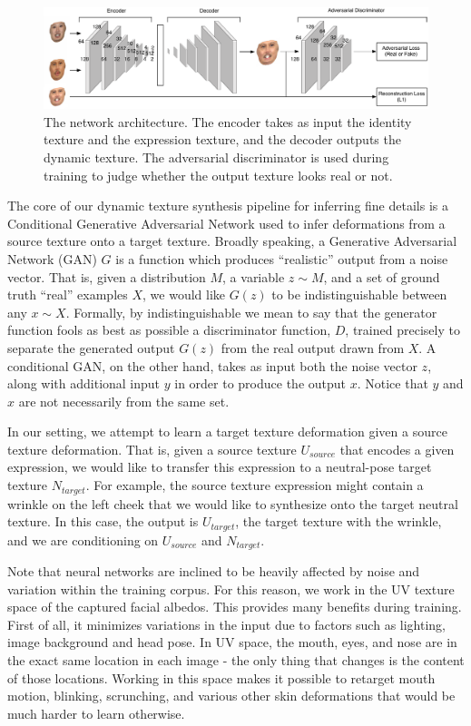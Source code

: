 \begin{figure}[th]
	\centering
	\includegraphics[width=1\linewidth]{figures/network/network5.pdf}
	\caption{The network architecture. The encoder takes as input the identity texture and the expression texture, and the decoder outputs the dynamic texture. The adversarial discriminator is used during training to judge whether the output texture looks real or not.}\label{fig:network}
	\vspace{-0.15in}
\end{figure}

The core of our dynamic texture synthesis pipeline for inferring fine details is a Conditional Generative Adversarial Network used to infer deformations from a source texture onto a target texture.
Broadly speaking, a Generative Adversarial Network (GAN) $G$ is a function which produces ``realistic'' output from a noise vector.  
That is, given a distribution $M$, a variable $z \sim M$, and a set of ground truth ``real'' examples $X$,  we would like $G(z)$ to be indistinguishable between 
any $x \sim X$.  Formally, by indistinguishable we mean to say that the generator function fools as best as possible a discriminator function, $D$, 
trained precisely to separate the generated output $G(z)$ from the real output drawn from $X$. A conditional GAN, on the other hand, takes as input both the noise vector $z$, along with additional input $y$ in order to produce the output $x$.    
Notice that $y$ and $x$ are not necessarily from the same set.  

In our setting, we attempt to learn a target texture deformation given a source texture deformation.  
That is, given a source texture $U_{source}$ that encodes a given expression, we would like to transfer this expression to a neutral-pose target texture $N_{target}$.  
For example, the source texture expression might contain a wrinkle on the left cheek that we would like to synthesize onto the target neutral texture. 
In this case, the output is $U_{target}$, the target texture with the wrinkle, and we are conditioning on $U_{source}$ and $N_{target}$.  


Note that neural networks are inclined to be heavily affected by noise and variation within the training corpus.  For this reason, we work in the UV texture space of the captured facial albedos.  This provides many benefits during training.  First of all, it minimizes variations in the input due to factors such as lighting, image background and head pose. In UV space, the mouth, eyes, and nose are in the exact same location in each image - the only thing that changes is the content of those locations. Working in this space makes it possible to retarget mouth motion, blinking, scrunching, and various other skin deformations that would be much harder to learn otherwise.  


